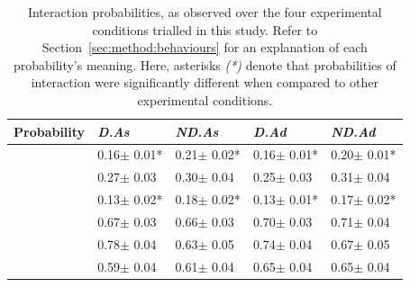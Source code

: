 \begin{table}[t!]
    \caption{Interaction probabilities, as observed over the four experimental conditions trialled in this study. Refer to Section~\ref{sec:method:behaviours} for an explanation of each probability's meaning. Here, asterisks \emph{(*)} denote that probabilities of interaction were significantly different when compared to other experimental conditions.}
    \label{tbl_probabilities}
    \renewcommand{\arraystretch}{1.4}
    \begin{center}
    \begin{small}
    \begin{tabulary}{\textwidth}{L{3.2cm}||D{1.6cm}|D{1.6cm}|D{1.6cm}|D{1.6cm}}
   
   \hline
    
    \textbf{Probability} & \textbf{\emph{D.As}} & \textbf{\emph{ND.As}} & \textbf{\emph{D.Ad}} & \textbf{\emph{ND.Ad}} \\ \hline\hline
     & 0.16$\pm$ 0.01* & 0.21$\pm$ 0.02* & 0.16$\pm$ 0.01* & 0.20$\pm$ 0.01* \\ \hline
     & 0.27$\pm$ 0.03 & 0.30$\pm$ 0.04 & 0.25$\pm$ 0.03 & 0.31$\pm$ 0.04 \\ \hline
     & 0.13$\pm$ 0.02* & 0.18$\pm$ 0.02* & 0.13$\pm$ 0.01* & 0.17$\pm$ 0.02* \\ \hline\hline
     & 0.67$\pm$ 0.03 & 0.66$\pm$ 0.03 & 0.70$\pm$ 0.03 & 0.71$\pm$ 0.04 \\ \hline
     & 0.78$\pm$ 0.04 & 0.63$\pm$ 0.05 & 0.74$\pm$ 0.04 & 0.67$\pm$ 0.05 \\ \hline
     & 0.59$\pm$ 0.04 & 0.61$\pm$ 0.04 & 0.65$\pm$ 0.04 & 0.65$\pm$ 0.04 \\ \hline
    \end{tabulary}
    \end{small}
    \end{center}
\end{table}

